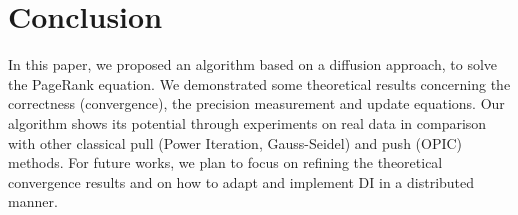 \documentclass{llncs}
\begin{document}
\section{Conclusion}
\label{sec:conclusion}
In this paper, we proposed an algorithm based on a diffusion approach, to solve the PageRank equation. We demonstrated some theoretical results concerning the correctness (convergence), the precision measurement and update equations. Our algorithm shows its potential through experiments on real data in comparison with other classical pull (Power Iteration, Gauss-Seidel) and push (OPIC) methods. For future works, we plan to focus on refining the theoretical convergence results and on how to adapt and implement DI in a distributed manner. 


\end{document}
